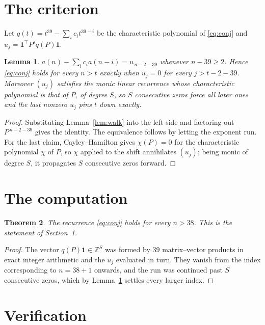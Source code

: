 \documentclass[11pt,a4paper]{article}
\theoremstyle{plain}
\newtheorem{theorem}{Theorem}
\newtheorem{lemma}[theorem]{Lemma}
\theoremstyle{definition}
\begin{document}
\section{The criterion}

Let $q(t)=t^{39}-\sum_i c_i t^{39-i}$ be the characteristic polynomial of
\eqref{eq:conj} and $u_j=\mathbf{1}^{\!\top}P^{j}q(P)\mathbf{1}$.

\begin{lemma}\label{lem:crit}
$a(n)-\sum_i c_i a(n-i)=u_{\,n-2-39}$ whenever $n-39\ge2$. Hence
\eqref{eq:conj} holds for every $n>t$ exactly when $u_j=0$ for every
$j>t-2-39$. Moreover $(u_j)$ satisfies the monic linear recurrence whose
characteristic polynomial is that of $P$, of degree $S$, so $S$ consecutive zeros force all
later ones and the last nonzero $u_j$ pins $t$ down exactly.
\end{lemma}

\begin{proof}
Substituting Lemma~\ref{lem:walk} into the left side and factoring out
$P^{\,n-2-39}$ gives the identity. The equivalence follows by letting the exponent
run. For the last claim, Cayley--Hamilton gives $\chi(P)=0$ for the characteristic
polynomial $\chi$ of $P$, so $\chi$ applied to the shift annihilates $(u_j)$; being monic of
degree $S$, it propagates $S$ consecutive zeros forward.
\end{proof}

\section{The computation}

\begin{theorem}
The recurrence \eqref{eq:conj} holds for every $n>38$. This is the statement of
Section~1.
\end{theorem}

\begin{proof}
The vector $q(P)\mathbf{1}\in\mathbb{Z}^{S}$ was formed by $39$ matrix--vector
products in exact integer arithmetic and the $u_j$ evaluated in turn. They vanish from the
index corresponding to $n=38+1$ onwards, and the run was continued past $S$ consecutive
zeros, which by Lemma~\ref{lem:crit} settles every larger index.
\end{proof}

\section{Verification}
\end{document}
